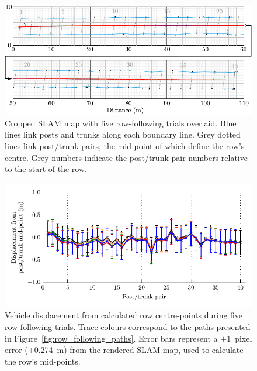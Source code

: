 \documentclass[preprint,authoryear,12pt]{elsarticle}
\begin{document}
    \begin{figure}[htb]
        \centering
        \includegraphics[width=\linewidth]{images/segmented_analysis_with_centres.pdf}
        \caption{
            Cropped SLAM map with five row-following trials overlaid.
            Blue lines link posts and trunks along each boundary line.
            Grey dotted lines link post/trunk pairs, the mid-point of which define the row's centre.
            Grey numbers indicate the post/trunk pair numbers relative to the start of the row.
        }
        \label{fig:row_following_paths_segmented}
    \end{figure}

    \begin{figure}[htb]
        \centering
        \includegraphics{images/row_tracking_averages.pdf}
        \caption{
            Vehicle displacement from calculated row centre-points during five row-following trials.
            Trace colours correspond to the paths presented in Figure~\ref{fig:row_following_paths}.
            Error bars represent a $\pm$\SI{1}{pixel} error ($\pm$\SI{0.274}{\meter}) from the rendered SLAM map, used to calculate the row's mid-points.
        }
        \label{fig:row_following_performance_analysis}
    \end{figure}
\end{document}
